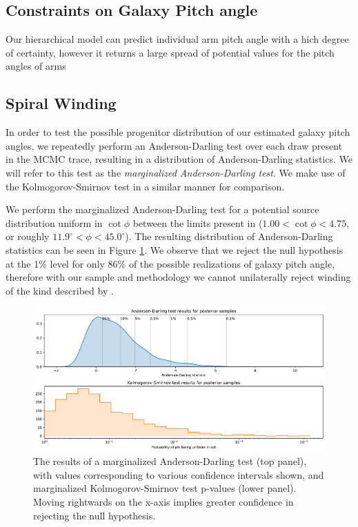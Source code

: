 \subsection{Constraints on Galaxy Pitch angle}
Our hierarchical model can predict individual arm pitch angle with a hich degree of certainty, however it returns a large spread of potential values for the pitch angles of arms

\subsection{Spiral Winding}
\label{section:spiral_winding}
In order to test the possible progenitor distribution of our estimated galaxy pitch angles, we repeatedly perform an Anderson-Darling test over each draw present in the MCMC trace, resulting in a distribution of Anderson-Darling statistics. We will refer to this test as the \textit{marginalized Anderson-Darling test}. We make use of the Kolmogorov-Smirnov test in a similar manner for comparison.

We perform the marginalized Anderson-Darling test for a potential source distribution uniform in $\cot\phi$ between the limits present in \citet{2019arXiv190910291P} ($1.00 < \cot\phi < 4.75$, or roughly $11.9^\circ < \phi < 45.0^\circ$). The resulting distribution of Anderson-Darling statistics can be seen in Figure \ref{fig:ad-cot-test}. We observe that we reject the null hypothesis at the 1\% level for only 86\% of the possible realizations of galaxy pitch angle, therefore with our sample and methodology we cannot unilaterally reject winding of the kind described by \citet{2019arXiv190910291P}.

\begin{figure}
  \includegraphics[width=17.7cm]{plots/cot_uniform_marginalized_tests.pdf}
  \caption{The results of a marginalized Anderson-Darling test (top panel), with values corresponding to various confidence intervals shown, and marginalized Kolmogorov-Smirnov test p-values (lower panel). Moving rightwards on the x-axis implies greater confidence in rejecting the null hypothesis.}
  \label{fig:ad-cot-test}
\end{figure}

